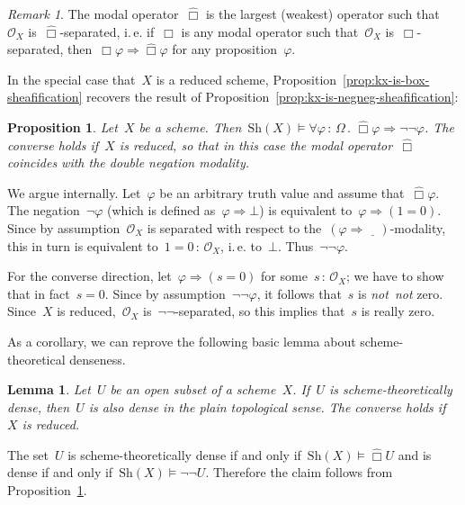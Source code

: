 \documentclass[10pt,reqno,a4paper]{amsbook}
\makeatletter
\theoremstyle{definition}
\theoremstyle{plain}
\newtheorem{prop}[defn]{Proposition}
\newtheorem{lemma}[defn]{Lemma}
\theoremstyle{remark}
\newtheorem{rem}[defn]{Remark}
\renewcommand{\O}{\mathcal{O}}
\newcommand{\placeholder}{\underline{\quad}}
\newcommand{\Sh}{\mathrm{Sh}}
\newcommand{\?}{\,{:}\,}
\renewcommand{\_}{\mathpunct{.}\,}
\newcommand{\sdense}{{\widehat\Box}}
\newcommand{\sdenseother}{\Box}
\newcommand{\ie}{i.\,e.\@\xspace}
\newcommand{\notnot}{\emph{not~not}\xspace}
\renewenvironment{proof}[1][\proofname]{\par
  \pushQED{\qed}%
  \normalfont \topsep6\p@\@plus6\p@\relax
  \trivlist
  \item[\hskip\labelsep
        \itshape
    #1\@addpunct{.}]\ignorespaces
}{%
  \popQED\endtrivlist\@endpefalse
}
\makeatother
\begin{document}
\begin{rem}The modal operator~$\sdense$ is the largest (weakest) operator such
that~$\O_X$ is~$\sdense$-separated, \ie if~$\sdenseother$ is any modal operator
such that~$\O_X$ is~$\sdenseother$-separated, then~$\sdenseother\varphi
\Rightarrow \sdense\varphi$ for any proposition~$\varphi$.\end{rem}

In the special case that~$X$ is a reduced scheme,
Proposition~\ref{prop:kx-is-box-sheafification} recovers
the result of Proposition~\ref{prop:kx-is-negneg-sheafification}:

\begin{prop}\label{prop:relation-sdense-notnot}
Let~$X$ be a scheme. Then~$\Sh(X) \models \forall\varphi\?\Omega\_
\sdense\varphi \Rightarrow \neg\neg\varphi$.
The converse holds if~$X$ is reduced, so that in
this case the modal operator~$\sdense$ coincides with the double negation modality.\end{prop}
\begin{proof}We argue internally. Let~$\varphi$ be an arbitrary truth value and
assume that~$\sdense\varphi$. The negation~$\neg\varphi$ (which is defined as~$\varphi \Rightarrow \bot$) is
equivalent to~$\varphi \Rightarrow (1 =
0)$. Since by assumption~$\O_X$ is separated with respect to the~$(\varphi
\Rightarrow \placeholder)$-modality, this in turn is equivalent to~$1 = 0 \?
\O_X$, \ie to~$\bot$. Thus~$\neg\neg\varphi$.

For the converse direction, let~$\varphi \Rightarrow (s = 0)$ for some~$s\?\O_X$;
we have to show that in fact~$s = 0$. Since by assumption~$\neg\neg\varphi$, it
follows that~$s$ is \notnot zero. Since~$X$ is reduced,~$\O_X$
is~$\neg\neg$-separated, so this implies that~$s$ is really zero.
\end{proof}

As a corollary, we can reprove the following basic lemma about
scheme-theoretical denseness.
\begin{lemma}Let~$U$ be an open subset of a scheme~$X$. If~$U$ is
scheme-theoretically dense, then~$U$ is also dense in the plain topological
sense. The converse holds if~$X$ is reduced.\end{lemma}
\begin{proof}The set~$U$ is scheme-theoretically dense if and only if~$\Sh(X)
\models \sdense U$ and is dense if and only if~$\Sh(X) \models \neg\neg U$.
Therefore the claim follows from Proposition~\ref{prop:relation-sdense-notnot}.
\end{proof}
\end{document}
